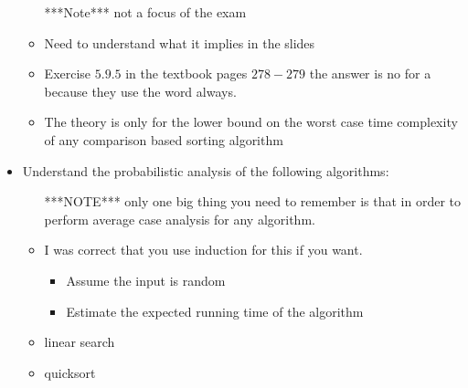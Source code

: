 \begin{itemize}
    \begin{itemize}
    \item [***Note***] not a focus of the exam
    \item Need to understand what it implies in the slides
    \item Exercise $5.9.5$ in the textbook pages $278-279$ the answer is no for a because they use the word always.
    \item The theory is only for the lower bound on the worst case time complexity of any comparison based sorting algorithm
    \end{itemize}
  \item Understand the probabilistic analysis of the following algorithms:
    \begin{itemize}
    \item [***NOTE***] only one big thing you need to remember is that in order to perform average case analysis for any algorithm.
    \item I was correct that you use induction for this if you want.
      \begin{itemize}
      \item Assume the input is random
      \item Estimate the expected running time of the algorithm
      \end{itemize}
    \item linear search
    \item quicksort
    \end{itemize}
  \end{itemize}
